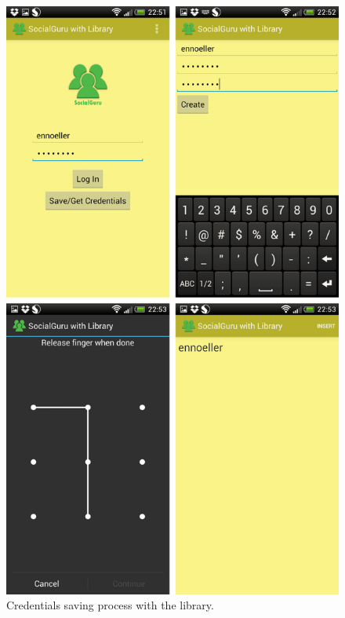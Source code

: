 \begin{figure}[H]
\begin{center}
\includegraphics[scale=0.3]{images/reg.png}
\caption{Credentials saving process with the library.}
\label{fig:credentials saving}
\end{center}
\end{figure}

